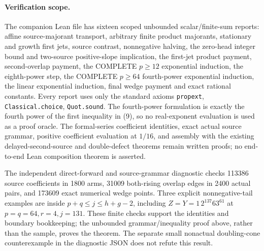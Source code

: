 \paragraph{Verification scope.}
The companion Lean file has sixteen scoped unbounded scalar/finite-sum
reports: affine source-majorant transport, arbitrary finite product
majorants, stationary and growth first jets, source contrast, nonnegative
halving, the zero-head integer bound and two-source positive-slope
implication, the first-jet product payment, second-overlap payment,
the COMPLETE $p\ge12$ exponential induction, the eighth-power step,
the COMPLETE $p\ge64$ fourth-power exponential induction, the linear
exponential induction, final wedge payment and exact rational constants.
Every report uses only the standard axioms \texttt{propext},
\texttt{Classical.choice}, \texttt{Quot.sound}.  The fourth-power
formulation is exactly the fourth power of the first inequality in (9),
so no real-exponent evaluation is used as a proof oracle.
The formal-series coefficient identities, exact actual source grammar,
positive coefficient evaluation at $1/16$, and assembly with the existing
delayed-second-source and double-defect theorems remain written proofs;
no end-to-end Lean composition theorem is asserted.

The independent direct-forward and source-grammar diagnostic checks
113386 source coefficients in 1800 arms, 31009 both-rising overlap
edges in 2400 actual pairs, and 173609 exact numerical wedge points.
Three explicit nonnegative-tail examples are inside
$p+q\le j\le h+g-2$, including
$Z=Y=1\,2^{137}63^{61}$ at $p=q=64,r=4,j=131$.
These finite checks support the identities and boundary bookkeeping;
the unbounded grammar/inequality proof above, rather than the sample,
proves the theorem.  The separate small nonactual doubling-cone
counterexample in the diagnostic JSON does not refute this result.
